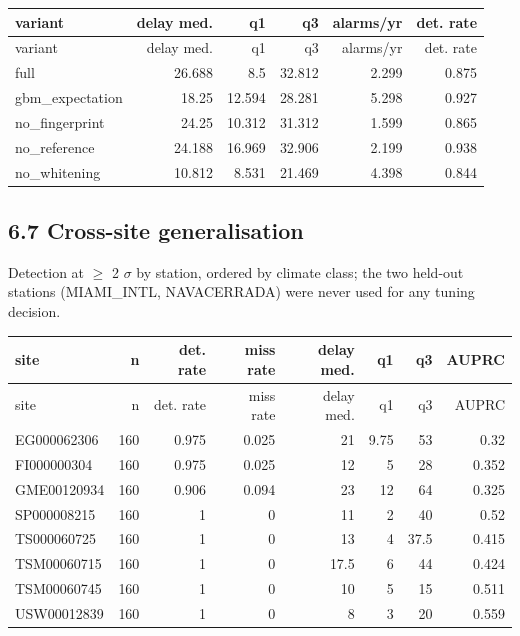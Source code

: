 \documentclass[10pt,a4paper]{article}
\begin{document}
{\small
\setlength{\tabcolsep}{4.5pt}
\setlength{\LTleft}{\fill}
\setlength{\LTright}{\fill}
\begin{longtable}{lrrrrr}
\toprule
variant & delay med. & q1 & q3 & alarms/\allowbreak{}yr & det. rate \\
\midrule
\endfirsthead
\toprule
variant & delay med. & q1 & q3 & alarms/\allowbreak{}yr & det. rate \\
\midrule
\endhead
\bottomrule
\endlastfoot
full & 26.688 & 8.5 & 32.812 & 2.299 & 0.875 \\
gbm\_\allowbreak{}expectation & 18.25 & 12.594 & 28.281 & 5.298 & 0.927 \\
no\_\allowbreak{}fingerprint & 24.25 & 10.312 & 31.312 & 1.599 & 0.865 \\
no\_\allowbreak{}reference & 24.188 & 16.969 & 32.906 & 2.199 & 0.938 \\
no\_\allowbreak{}whitening & 10.812 & 8.531 & 21.469 & 4.398 & 0.844 \\
\end{longtable}
}

\subsection*{6.7 Cross-\allowbreak{}site generalisation}
Detection at $\geq$ 2 $\sigma$ by station, ordered by climate class; the two held-\allowbreak{}out stations (MIAMI\_\allowbreak{}INTL, NAVACERRADA) were never used for any tuning decision.

{\small
\setlength{\tabcolsep}{3pt}
\setlength{\LTleft}{\fill}
\setlength{\LTright}{\fill}
\begin{longtable}{lrrrrrrr}
\toprule
site & n & det. rate & miss rate & delay med. & q1 & q3 & AUPRC \\
\midrule
\endfirsthead
\toprule
site & n & det. rate & miss rate & delay med. & q1 & q3 & AUPRC \\
\midrule
\endhead
\bottomrule
\endlastfoot
EG000062306 & 160 & 0.975 & 0.025 & 21 & 9.75 & 53 & 0.32 \\
FI000000304 & 160 & 0.975 & 0.025 & 12 & 5 & 28 & 0.352 \\
GME00120934 & 160 & 0.906 & 0.094 & 23 & 12 & 64 & 0.325 \\
SP000008215 & 160 & 1 & 0 & 11 & 2 & 40 & 0.52 \\
TS000060725 & 160 & 1 & 0 & 13 & 4 & 37.5 & 0.415 \\
TSM00060715 & 160 & 1 & 0 & 17.5 & 6 & 44 & 0.424 \\
TSM00060745 & 160 & 1 & 0 & 10 & 5 & 15 & 0.511 \\
USW00012839 & 160 & 1 & 0 & 8 & 3 & 20 & 0.559 \\
\end{longtable}
}
\end{document}
